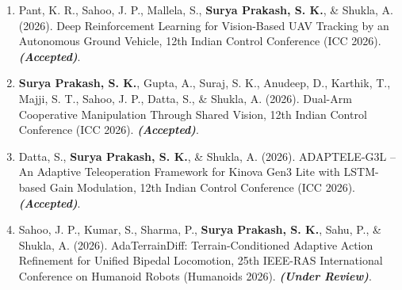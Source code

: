 \begin{Publications}
\begin{enumerate}
\item Pant, K. R., Sahoo, J. P., Mallela, S., \textbf{Surya Prakash, S. K.}, \& Shukla, A. (2026). Deep Reinforcement Learning for Vision-Based UAV Tracking by an Autonomous Ground Vehicle, 12th Indian Control Conference (ICC 2026). \textbf{\textit{(Accepted)}}.

\item \textbf{Surya Prakash, S. K.}, Gupta, A., Suraj, S. K., Anudeep, D., Karthik, T., Majji, S. T., Sahoo, J. P., Datta, S., \& Shukla, A. (2026). Dual-Arm Cooperative Manipulation Through Shared Vision, 12th Indian Control Conference (ICC 2026). \textbf{\textit{(Accepted)}}.


\item Datta, S., \textbf{Surya Prakash, S. K.}, \& Shukla, A. (2026). ADAPTELE-G3L – An Adaptive Teleoperation Framework for Kinova Gen3 Lite with LSTM-based Gain Modulation, 12th Indian Control Conference (ICC 2026). \textbf{\textit{(Accepted)}}.

\item Sahoo, J. P., Kumar, S., Sharma, P., \textbf{Surya Prakash, S. K.}, Sahu, P., \& Shukla, A. (2026). AdaTerrainDiff: Terrain-Conditioned Adaptive Action Refinement for Unified Bipedal Locomotion, 25th IEEE-RAS International Conference on Humanoid Robots (Humanoids 2026). \textbf{\textit{(Under Review)}}.









\end{enumerate}
\end{Publications}
